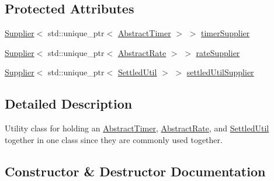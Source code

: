 \subsection*{Protected Attributes}
\begin{DoxyCompactItemize}
\item 
\mbox{\hyperlink{classokapi_1_1Supplier}{Supplier}}$<$ std\+::unique\+\_\+ptr$<$ \mbox{\hyperlink{classokapi_1_1AbstractTimer}{Abstract\+Timer}} $>$ $>$ \mbox{\hyperlink{classokapi_1_1TimeUtil_ac1d9f2cc535d5de97172645a3456e141}{timer\+Supplier}}
\item 
\mbox{\hyperlink{classokapi_1_1Supplier}{Supplier}}$<$ std\+::unique\+\_\+ptr$<$ \mbox{\hyperlink{classokapi_1_1AbstractRate}{Abstract\+Rate}} $>$ $>$ \mbox{\hyperlink{classokapi_1_1TimeUtil_afdd2a5ab8f268868daf26ecd74580983}{rate\+Supplier}}
\item 
\mbox{\hyperlink{classokapi_1_1Supplier}{Supplier}}$<$ std\+::unique\+\_\+ptr$<$ \mbox{\hyperlink{classokapi_1_1SettledUtil}{Settled\+Util}} $>$ $>$ \mbox{\hyperlink{classokapi_1_1TimeUtil_aab5bc0e4f9c14b511c53211f2374fa1b}{settled\+Util\+Supplier}}
\end{DoxyCompactItemize}


\subsection{Detailed Description}
Utility class for holding an \mbox{\hyperlink{classokapi_1_1AbstractTimer}{Abstract\+Timer}}, \mbox{\hyperlink{classokapi_1_1AbstractRate}{Abstract\+Rate}}, and \mbox{\hyperlink{classokapi_1_1SettledUtil}{Settled\+Util}} together in one class since they are commonly used together. 

\subsection{Constructor \& Destructor Documentation}
\mbox{\label{classokapi_1_1TimeUtil_a5c723190393428cab7621d3f9e60fc85}} 
